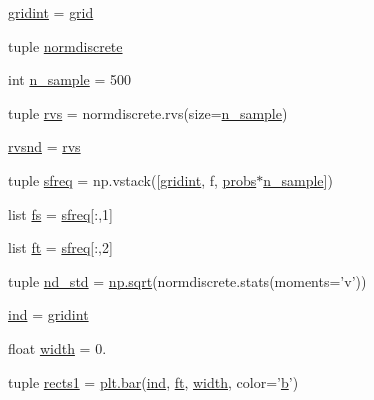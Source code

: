 \begin{DoxyCompactItemize}
\item 
\hyperlink{namespacenormdiscr__plot1_a3b3d0e3f33ebb403b17ac30f9642feae}{gridint} = \hyperlink{namespacenormdiscr__plot1_af8eb490ddab12afc11e8a4e7144d7843}{grid}
\item 
tuple \hyperlink{namespacenormdiscr__plot1_a98bd5496f1b34315e1a9969be6bce109}{normdiscrete}
\item 
int \hyperlink{namespacenormdiscr__plot1_afe6b7c6840b8b01b408c4777f4c9485f}{n\+\_\+sample} = 500
\item 
tuple \hyperlink{namespacenormdiscr__plot1_a611135405e8f549e91423e1afb8548f2}{rvs} = normdiscrete.\+rvs(size=\hyperlink{namespacenormdiscr__plot1_afe6b7c6840b8b01b408c4777f4c9485f}{n\+\_\+sample})
\item 
\hyperlink{namespacenormdiscr__plot1_a26ceeab16d31b28ff8862ced0a45410b}{rvsnd} = \hyperlink{namespacenormdiscr__plot1_a611135405e8f549e91423e1afb8548f2}{rvs}
\item 
tuple \hyperlink{namespacenormdiscr__plot1_a320997d51e3922fc224dc09a1dc05fc6}{sfreq} = np.\+vstack(\mbox{[}\hyperlink{namespacenormdiscr__plot1_a3b3d0e3f33ebb403b17ac30f9642feae}{gridint}, f, \hyperlink{namespacenormdiscr__plot1_a2ba9cf9aea62e481cf4d32d07cddbd39}{probs}$\ast$\hyperlink{namespacenormdiscr__plot1_afe6b7c6840b8b01b408c4777f4c9485f}{n\+\_\+sample}\mbox{]})
\item 
list \hyperlink{namespacenormdiscr__plot1_a0446c5eb37b12bdea2ce5f1705261e33}{fs} = \hyperlink{namespacenormdiscr__plot1_a320997d51e3922fc224dc09a1dc05fc6}{sfreq}\mbox{[}\+:,1\mbox{]}
\item 
list \hyperlink{namespacenormdiscr__plot1_a400e325c29f040931fb0858597b37053}{ft} = \hyperlink{namespacenormdiscr__plot1_a320997d51e3922fc224dc09a1dc05fc6}{sfreq}\mbox{[}\+:,2\mbox{]}
\item 
tuple \hyperlink{namespacenormdiscr__plot1_a6586cc3d111854363bd04edaa6bb15f2}{nd\+\_\+std} = \hyperlink{vecuops_8cc_ac9f82fdb8cd289615247f897852ee5f2}{np.\+sqrt}(normdiscrete.\+stats(moments='v'))
\item 
\hyperlink{namespacenormdiscr__plot1_a67682d8f96953cd3e89c85879fda2720}{ind} = \hyperlink{namespacenormdiscr__plot1_a3b3d0e3f33ebb403b17ac30f9642feae}{gridint}
\item 
float \hyperlink{namespacenormdiscr__plot1_a6c937267be6822f1ede0b9b040779f27}{width} = 0.
\item 
tuple \hyperlink{namespacenormdiscr__plot1_a2181998588c54cf2e52c63bfd440e939}{rects1} = \hyperlink{eepromer_8c_a2924c0b64ca8f0b241891bcc826b5602}{plt.\+bar}(\hyperlink{namespacenormdiscr__plot1_a67682d8f96953cd3e89c85879fda2720}{ind}, \hyperlink{namespacenormdiscr__plot1_a400e325c29f040931fb0858597b37053}{ft}, \hyperlink{namespacenormdiscr__plot1_a6c937267be6822f1ede0b9b040779f27}{width}, color='\hyperlink{gen__mat5files_8m_a7b38767b3b6a8dae167e5afa4fc340b0}{b}')

\end{DoxyCompactItemize}
